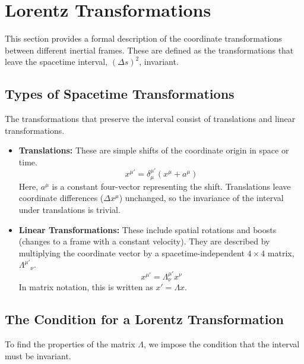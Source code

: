 \documentclass[11pt, a4paper]{report}
\begin{document}
\section{Lorentz Transformations}

This section provides a formal description of the coordinate transformations between different inertial frames. These are defined as the transformations that leave the spacetime interval, $(\Delta s)^2$, invariant.

\subsection*{Types of Spacetime Transformations}

The transformations that preserve the interval consist of translations and linear transformations.

\begin{itemize}
    \item \textbf{Translations:} These are simple shifts of the coordinate origin in space or time.
    \begin{equation}\label{eq:translation}
        x^{\mu'} = \delta^{\mu'}_\mu (x^\mu + a^\mu)
    \end{equation}
    Here, $a^\mu$ is a constant four-vector representing the shift. Translations leave coordinate differences ($\Delta x^\mu$) unchanged, so the invariance of the interval under translations is trivial.

    \item \textbf{Linear Transformations:} These include spatial rotations and boosts (changes to a frame with a constant velocity). They are described by multiplying the coordinate vector by a spacetime-independent $4 \times 4$ matrix, $\Lambda^{\mu'}{}_\nu$.
    \begin{equation}\label{eq:linear-transform}
        x^{\mu'} = \Lambda^{\mu'}_\nu x^\nu
    \end{equation}
    In matrix notation, this is written as $x' = \Lambda x$.
\end{itemize}

\subsection*{The Condition for a Lorentz Transformation}

To find the properties of the matrix $\Lambda$, we impose the condition that the interval must be invariant.
\end{document}

